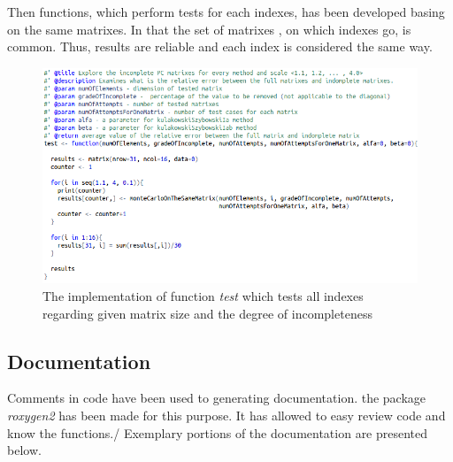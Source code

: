 Then functions, which perform tests for each indexes, has been developed basing on the same matrixes. In that the set of matrixes , on which indexes go, is common. Thus, results are reliable and each index is considered the same way.

\begin{figure}[h]
\centerline{\includegraphics[scale=0.58]{images/kod22.png}}
\caption{The implementation of function \textit{test} which tests all indexes regarding given matrix size and the degree of incompleteness}
\label{fig:rstudio}
\end{figure}


\subsection{Documentation}
Comments in code have been used to generating documentation. the package \textit{roxygen2} has been made for this purpose. It has allowed to easy review code and know the functions./
Exemplary portions of the documentation are presented below.

